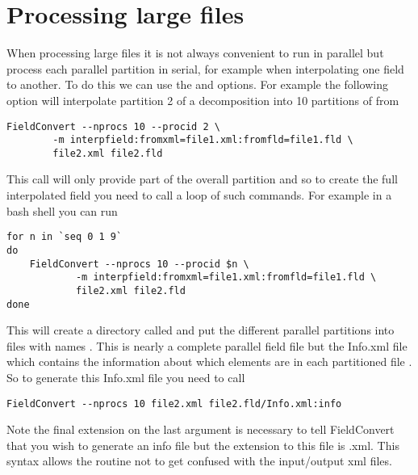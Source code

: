 \section{Processing large files}
When processing large files it is not always convenient to run in parallel 
but process each parallel partition in serial, for example when interpolating 
one field to another. To do this we can use the  and 
 options. For example the following option will interpolate 
partition 2 of a decomposition into 10 partitions of  from 
\begin{lstlisting}[style=BashInputStyle] 
FieldConvert --nprocs 10 --procid 2 \
        -m interpfield:fromxml=file1.xml:fromfld=file1.fld \
        file2.xml file2.fld
\end{lstlisting}
This call will only provide part of the overall partition and so to create the 
full interpolated field you need to call a loop of such commands. For example 
in a bash shell you can run
\begin{lstlisting}[style=BashInputStyle] 
for n in `seq 0 1 9`
do 
    FieldConvert --nprocs 10 --procid $n \ 
            -m interpfield:fromxml=file1.xml:fromfld=file1.fld \
            file2.xml file2.fld
done
\end{lstlisting}

This will create a directory called  and put the different 
parallel partitions into files with names 
. This is nearly a complete
parallel field file but the Info.xml file which contains the information about 
which elements are in each partitioned file \inltt{P000000X.fld}. So to generate
this Info.xml file you need to call
\begin{lstlisting}[style=BashInputStyle] 
FieldConvert --nprocs 10 file2.xml file2.fld/Info.xml:info
\end{lstlisting}
Note the final \inltt{:info} extension on the last argument is necessary to 
tell FieldConvert that you wish to generate an info file but the extension 
to this file is .xml. This syntax allows the routine not to get confused with 
the input/output xml files.

